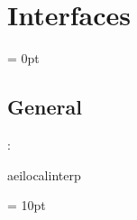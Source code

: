 
\section{Interfaces} 


\parskip = 0pt

\vspace{3mm} \subsection*{General}

: 

aeilocalinterp
\vspace{2mm}

\vspace{5mm}\parskip = 10pt 
